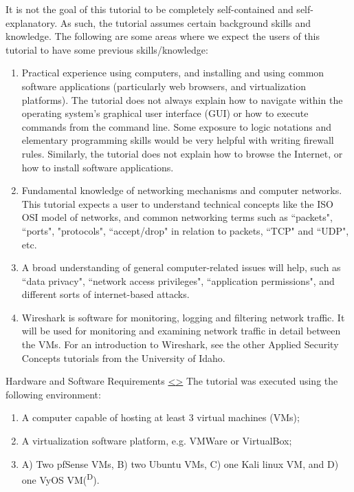 \documentclass[12pt]{extarticle}
\newenvironment{instructionblock}{\Large\bgroup}{\egroup}
\newcommand{\ben}{\begin{enumerate}}
\newcommand{\een}{\end{enumerate}}
\begin{document}
\vspace{8mm}
\noindent
It is not the goal of this tutorial to be completely self-contained and self-explanatory. As such, the tutorial assumes certain background skills and knowledge. The following are some areas where we expect the users of this tutorial to have some previous skills/knowledge:

\ben

\item Practical experience using computers, and installing and using common software applications (particularly web browsers, and virtualization platforms). The tutorial does not always explain how to navigate within the operating system's graphical user interface (GUI) or how to execute commands from the command line. Some exposure to logic notations and elementary programming skills would be very helpful with writing firewall rules. Similarly, the tutorial does not explain how to browse the Internet, or how to install software applications.

\item Fundamental knowledge of networking mechanisms and computer networks. This tutorial expects a user to understand technical concepts like the ISO OSI model of networks, and common networking terms such as ``packets", ``ports", "protocols", ``accept/drop" in relation to packets, ``TCP" and ``UDP", etc.

\item A broad understanding of general computer-related issues will help, such as ``data privacy", ``network access privileges", ``application permissions", and different sorts of internet-based attacks.

\item Wireshark is software for monitoring, logging and filtering network traffic. It will be used for monitoring and examining network traffic in detail between the VMs. For an introduction to Wireshark, see the other Applied Security Concepts tutorials from the University of Idaho.

\een 







\pagebreak
\begin{slide}{ Hardware and Software Requirements }{ \hyperref[slide 2]{\textless}\hyperref[slide 4]{\textgreater} }
    \begin{instructionblock}
    	The tutorial was executed using the following environment:
    	\begin{enumerate}
    		\item A computer capable of hosting at least 3 virtual machines (VMs);
    		\item A virtualization software platform, e.g. VMWare or VirtualBox;
    		\item A) Two pfSense VMs, B) two Ubuntu VMs, C) one Kali linux VM, and D) one VyOS VM(\textsuperscript{D}).
    	\end{enumerate}
    \end{instructionblock}
\end{slide}
\end{document}
